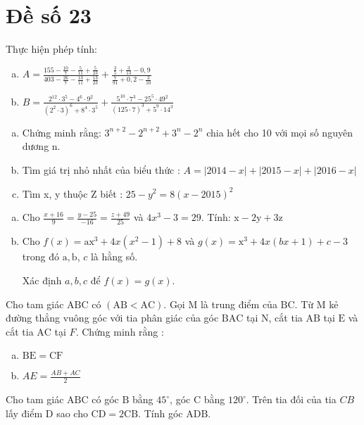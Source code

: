 \onehalfspacing
\section{Đề số 23}
\graphicspath{{./img/}}
\begin{bt} 
    Thực hiện phép tính:
   \begin{enumerate}[a.]
    \item $A=\frac{155-\frac{10}{7}-\frac{5}{11}+\frac{5}{23}}{403-\frac{26}{7}-\frac{13}{11}+\frac{13}{23}}+\frac{\frac{3}{5}+\frac{3}{13}-0,9}{\frac{7}{91}+0,2-\frac{3}{10}}$
    \item $B=\frac{2^{12} \cdot 3^5-4^6 \cdot 9^2}{\left(2^2 \cdot 3\right)^6+8^4 \cdot 3^5}+\frac{5^{10} \cdot 7^3-25^5 \cdot 49^2}{(125 \cdot 7)^3+5^9 \cdot 14^3}$
   \end{enumerate}
\loigiai{}
\end{bt}

\begin{bt}
    \hfill
	\begin{enumerate}[a.]
        \item Chứng minh rằng: $3^{n+2}-2^{n+2}+3^n-2^n$ chia hết cho 10 với mọi số nguyên dương $\mathrm{n}$.
        \item Tìm giá trị nhỏ nhất của biểu thức : $A=|2014-x|+|2015-x|+|2016-x|$
        \item Tìm x, y thuộc $\mathrm{Z}$ biết : $25-y^2=8(x-2015)^2$
    \end{enumerate}
	\loigiai{} 
\end{bt}

\begin{bt}
    \hfill
    \begin{enumerate}[a.]
        \item Cho $\frac{x+16}{9}=\frac{y-25}{-16}=\frac{z+49}{25}$ và $4 x^3-3=29$. Tính: $\mathrm{x}-2 \mathrm{y}+3 \mathrm{z}$
        \item Cho $f(x)=\mathrm{ax}^3+4 x\left(x^2-1\right)+8$ và $g(x)=\mathrm{x}^3+4 x(b x+1)+c-3$ trong đó $\mathrm{a}, \mathrm{b}$, $c$ là hằng số. 
        
        Xác định $a, b, c$ để $f(x)=g(x)$.
    \end{enumerate}
	\loigiai{}
\end{bt}

\begin{bt}
    Cho tam giác $\mathrm{ABC}$ có $(\mathrm{AB}<\mathrm{AC})$. Gọi $\mathrm{M}$ là trung điểm của $\mathrm{BC}$. Từ $\mathrm{M}$ kẻ đường thẳng vuông góc với tia phân giác của góc $\mathrm{BAC}$ tại $\mathrm{N}$, cắt tia $\mathrm{AB}$ tại $\mathrm{E}$ và cắt tia $\mathrm{AC}$ tại $F$. Chứng minh rằng :
    \begin{enumerate}[a.]
        \item $\mathrm{BE}=\mathrm{CF}$
        \item $A E=\frac{A B+A C}{2}$
    \end{enumerate}
\loigiai{}
\end{bt}

\begin{bt}
   Cho tam giác $\mathrm{ABC}$ có góc $\mathrm{B}$ bằng $45^{\circ}$, góc $\mathrm{C}$ bằng $120^{\circ}$. Trên tia đối của tia $CB$ lấy điểm $\mathrm{D}$ sao cho $\mathrm{CD}=2 \mathrm{CB}$. Tính góc $\mathrm{ADB}$.
\loigiai{}
\end{bt}

